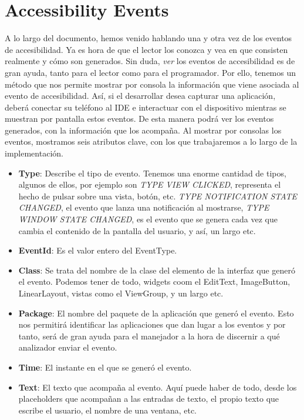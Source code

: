 \documentclass[12pt,a4paper,oneside]{book} %
\begin{document}
\section{Accessibility Events}
A lo largo del documento, hemos venido hablando una y otra vez de los eventos de accesibilidad. Ya es hora de que el lector los conozca y vea en que consisten realmente y cómo son generados. 
\newline \newline 
Sin duda, \textit{ver} los eventos de accesibilidad es de gran ayuda, tanto para el lector como para el programador. Por ello, tenemos un método que nos permite mostrar por consola la información que viene asociada al evento de accesibilidad. 
\newline \newline 
Así, si el desarrollar desea capturar una aplicación, deberá conectar su teléfono al IDE e interactuar con el dispositivo mientras se muestran por pantalla estos eventos. De esta manera podrá ver los eventos generados, con la información que los acompaña. 
\newline \newline 
Al mostrar por consolas los eventos, mostramos seis atributos clave, con los que trabajaremos a lo largo de la implementación. 
\begin{itemize}
	\item \textbf{Type}: Describe el tipo de evento. Tenemos una enorme cantidad de tipos, algunos de ellos, por ejemplo son \textit{TYPE VIEW CLICKED}, representa el hecho de pulsar sobre una vista, botón, etc. \textit{TYPE NOTIFICATION STATE CHANGED}, el evento que lanza una notificación al mostrarse, \textit{TYPE WINDOW STATE CHANGED}, es el evento que se genera cada vez que cambia el contenido de la pantalla del usuario, y así, un largo etc. 
	\item \textbf{EventId}: Es el valor entero del EventType. 
	\item \textbf{Class}: Se trata del nombre de la clase del elemento de la interfaz que generó el evento. Podemos tener de todo, widgets  coom el EditText, ImageButton, LinearLayout, vistas como el ViewGroup, y un largo etc.
	\item \textbf{Package}: El nombre del paquete de la aplicación que generó el evento. Esto nos permitirá identificar las aplicaciones que dan lugar a los eventos y por tanto, será de gran ayuda para el manejador a la hora de discernir a qué analizador enviar el evento. 
	\item \textbf{Time}: El instante en el que se generó el evento. 
	\item \textbf{Text}: El texto que acompaña al evento. Aquí puede haber de todo, desde los placeholders que acompañan a las entradas de texto, el propio texto que escribe el usuario, el nombre de una ventana, etc. 
\end{itemize}
\end{document}
